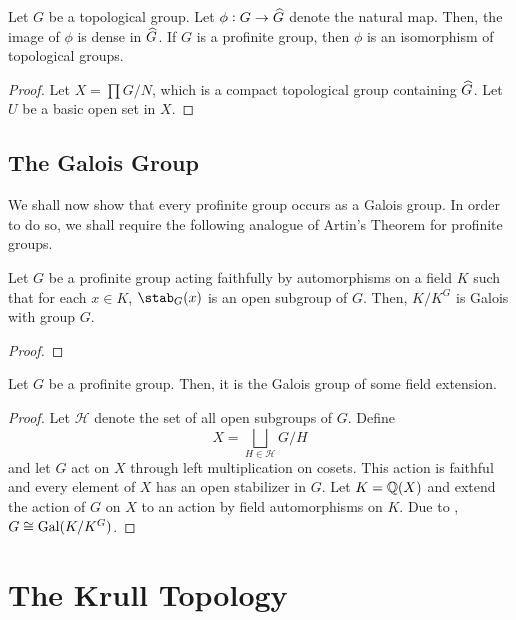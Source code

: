 \begin{theorem}
    Let $G$ be a topological group. Let $\phi: G\to\widehat{G}$ denote the natural map. Then, the image of $\phi$ is dense in $\widehat{G}$. If $G$ is a profinite group, then $\phi$ is an isomorphism of topological groups.
\end{theorem}
\begin{proof}
    Let $X = \prod G/N$, which is a compact topological group containing $\widehat{G}$. Let $U$ be a basic open set in $X$.
\end{proof}

\subsection{The Galois Group}

We shall now show that every profinite group occurs as a Galois group. In order to do so, we shall require the following analogue of Artin's Theorem for profinite groups. 

\begin{theorem}
    Let $G$ be a profinite group acting faithfully by automorphisms on a field $K$ such that for each $x\in K$, $\stab_G(x)$ is an open subgroup of $G$. Then, $K/K^G$ is Galois with group $G$.
\end{theorem}
\begin{proof}
    
\end{proof}

\begin{theorem}[Waterhouse]
    Let $G$ be a profinite group. Then, it is the Galois group of some field extension.
\end{theorem}
\begin{proof}
    Let $\mathcal H$ denote the set of all open subgroups of $G$. Define
    \begin{equation*}
        X = \bigsqcup_{H\in\mathcal H}G/H
    \end{equation*}
    and let $G$ act on $X$ through left multiplication on cosets. This action is faithful and every element of $X$ has an open stabilizer in $G$. Let $K = \mathbb{Q}(X)$ and extend the action of $G$ on $X$ to an action by field automorphisms on $K$. Due to , $G\cong\operatorname{Gal}(K/K^G)$.
\end{proof}

\section{The Krull Topology}

